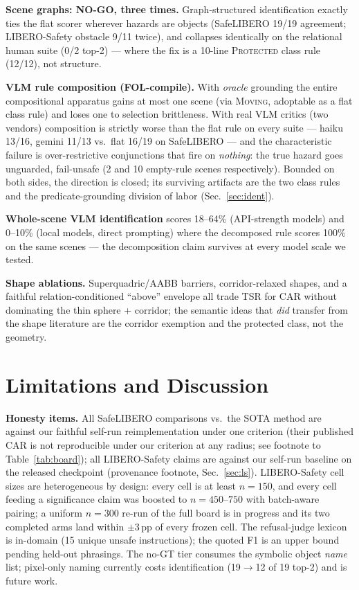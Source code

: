 \documentclass[conference]{IEEEtran}
\begin{document}
\textbf{Scene graphs: NO-GO, three times.} Graph-structured identification exactly ties the flat scorer wherever hazards are objects (SafeLIBERO 19/19 agreement; LIBERO-Safety obstacle 9/11 twice), and collapses identically on the relational human suite (0/2 top-2) --- where the fix is a 10-line \textsc{Protected} class rule (12/12), not structure.

\textbf{VLM rule composition (FOL-compile).} With \emph{oracle} grounding the entire compositional apparatus gains at most one scene (via \textsc{Moving}, adoptable as a flat class rule) and loses one to selection brittleness. With real VLM critics (two vendors) composition is strictly worse than the flat rule on every suite --- haiku 13/16, gemini 11/13 vs.\ flat 16/19 on SafeLIBERO --- and the characteristic failure is over-restrictive conjunctions that fire on \emph{nothing}: the true hazard goes unguarded, fail-unsafe (2 and 10 empty-rule scenes respectively). Bounded on both sides, the direction is closed; its surviving artifacts are the two class rules and the predicate-grounding division of labor (Sec.~\ref{sec:ident}).

\textbf{Whole-scene VLM identification} scores 18--64\% (API-strength models) and 0--10\% (local models, direct prompting) where the decomposed rule scores 100\% on the same scenes --- the decomposition claim survives at every model scale we tested.

\textbf{Shape ablations.} Superquadric/AABB barriers, corridor-relaxed shapes, and a faithful relation-conditioned ``above'' envelope all trade TSR for CAR without dominating the thin sphere + corridor; the semantic ideas that \emph{did} transfer from the shape literature are the corridor exemption and the protected class, not the geometry.

\section{Limitations and Discussion}
\label{sec:limitations}

\textbf{Honesty items.} All SafeLIBERO comparisons vs.\ the SOTA method are against our faithful self-run reimplementation under one criterion (their published CAR is not reproducible under our criterion at any radius; see footnote to Table~\ref{tab:board}); all LIBERO-Safety claims are against our self-run baseline on the released checkpoint (provenance footnote, Sec.~\ref{sec:ls}). LIBERO-Safety cell sizes are heterogeneous by design: every cell is at least $n{=}150$, and every cell feeding a significance claim was boosted to $n{=}450$--$750$ with batch-aware pairing; a uniform $n{=}300$ re-run of the full board is in progress and its two completed arms land within $\pm$3\,pp of every frozen cell. The refusal-judge lexicon is in-domain (15 unique unsafe instructions); the quoted F1 is an upper bound pending held-out phrasings. The no-GT tier consumes the symbolic object \emph{name} list; pixel-only naming currently costs identification (19$\to$12 of 19 top-2) and is future work.
\end{document}
